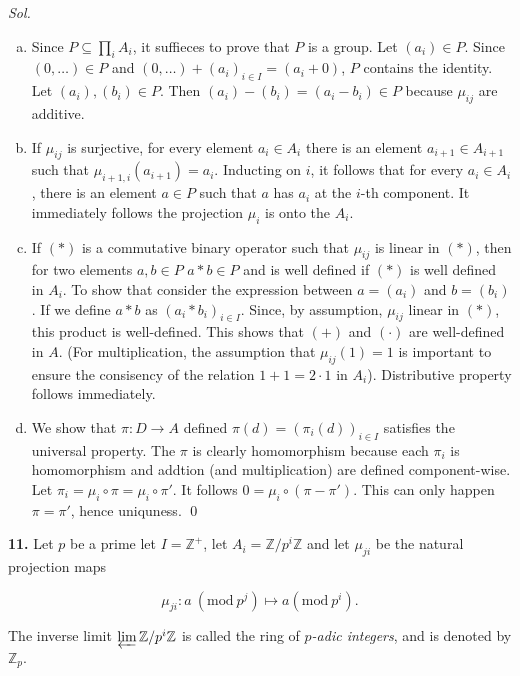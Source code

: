 \documentclass{article}
\theoremstyle{definition}
\theoremstyle{remark}
\begin{document}
\textit{ Sol. }
\begin{enumerate}[(a)]
    \item Since $P \subseteq \prod_i A_i$, it suffieces to prove that $P$ is a group. Let $(a_i) \in P$. Since $(0, \dots) \in P$ and $(0, \dots) + (a_i)_{i\in I} = (a_i + 0)$, $P$ contains the identity. Let 
    $(a_i), (b_i) \in P$. Then $(a_i) - (b_i) = (a_i - b_i) \in P$ because $\mu_{ij}$ are additive.

    \item If $\mu_{ij}$ is surjective, for every element $a_i \in A_i$ there is an element $a_{i+1} \in A_{i+1}$ such that $\mu_{i+1, i}(a_{i+1}) = a_i$. Inducting on $i$, it follows that for every $a_i \in A_i$, there is an element $a \in P$ such that $a$ has $a_i$ at the $i$-th component. It immediately follows the projection $\mu_i$ is onto the $A_i$.
    
    \item If $(*)$ is a commutative binary operator such that  $\mu_{ij}$ is linear in $(*)$, then for two elements $a, b \in P$ $a*b \in P$ and is well defined if $(*)$ is well defined in $A_i$. To show that consider the expression between $a = (a_i)$ and $b = (b_i)$. If we define $a*b$ as $(a_i * b_i)_{i \in I}$. Since, by assumption,  $\mu_{ij}$ linear in $(*)$, this product is well-defined. This shows that $(+)$ and $(\cdot)$ are well-defined in $A$. (For multiplication, the assumption that $\mu_{ij}(1) = 1$ is important to ensure the consisency of the relation $1 + 1 = 2 \cdot 1$ in $A_i$). Distributive property follows immediately.
    
    \item We show that $\pi: D \to A$ defined $\pi(d) = (\pi_i(d))_{i \in I}$ satisfies the universal property. The $\pi$ is clearly homomorphism because each $\pi_i$ is homomorphism and addtion (and multiplication) are defined component-wise. Let $\pi_i = \mu_i \circ \pi = \mu_i \circ \pi'.$ It follows $0 = \mu_i \circ(\pi - \pi')$. This can only happen $\pi  = \pi'$, hence uniquness. \qed
\end{enumerate}


\noindent \textbf{11.} Let $p$ be a prime let $I=\mathbb{Z}^{+}$, let $A_{i}=\mathbb{Z}/p^{i}\mathbb{Z}$ and let $\mu_{ji}$ be the natural projection maps

\[
\mu_{ji}:a\ (\mathrm{mod}\ p^{j})\longmapsto a(\mathrm{mod}\ p^{i}).
\]

The inverse limit $\varprojlim\mathbb{Z}/p^{i}\mathbb{Z}$ is called the ring of \textit{$p$-adic integers}, and is denoted by $\mathbb{Z}_{p}$.
\end{document}
